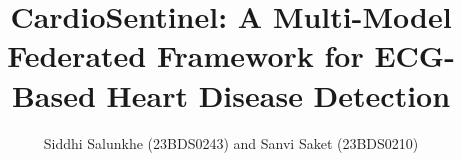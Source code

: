 \documentclass[journal]{IEEEtran}
\begin{document}
\title{CardioSentinel: A Multi-Model Federated Framework
for ECG-Based Heart Disease Detection}

\author{Siddhi Salunkhe (23BDS0243) and Sanvi Saket (23BDS0210)}


\maketitle










\end{document}
